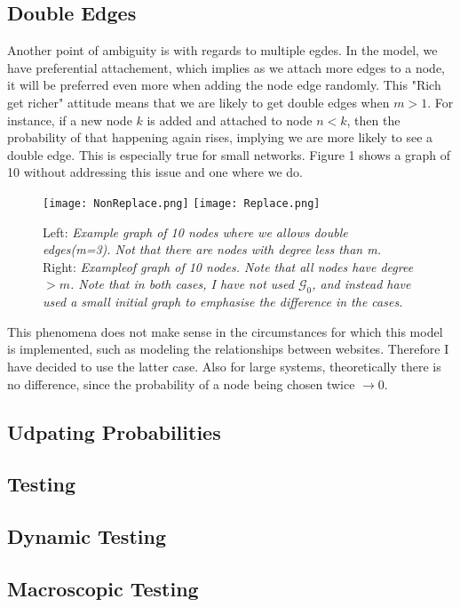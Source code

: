 \documentclass[]{article}
\begin{document}
\subsection{Double Edges}
Another point of ambiguity is with regards to multiple egdes. In  the model, we have preferential attachement, which implies as we attach more edges to a node, it will be preferred even more when adding the node edge randomly. This "Rich get richer" attitude means that we are likely to get double edges when $m>1$. For instance, if a new node $k$ is added and attached to node $n<k$, then the probability of that happening again rises, implying we are more likely to see a double edge. This is especially true for small networks. Figure 1 shows a graph of 10 without addressing this issue and one where we do.
\begin{figure}[htp]
	\centering
	
	\texttt{[image: NonReplace.png]}
	\texttt{[image: Replace.png]}
	\caption{Left: \textit{Example graph of 10 nodes where we allows double edges(m=3). Not that there are nodes with degree less than m.}
		\\Right: \textit{Exampleof graph of 10 nodes. Note that all nodes have degree $>m$. Note that in both cases, I have not used $\mathcal{G}_0$, and instead have used a small initial graph to emphasise the difference in the cases.}}
\end{figure} 
This phenomena does not make sense in the circumstances for which this model is implemented, such as modeling the relationships between websites. Therefore I have decided to use the latter case. Also for large systems, theoretically there is no difference, since the probability of a node being chosen twice $\rightarrow 0$.
\subsection{Udpating Probabilities}

\subsection{Testing}
\subsection{Dynamic Testing}
\subsection{Macroscopic Testing}
\end{document}
